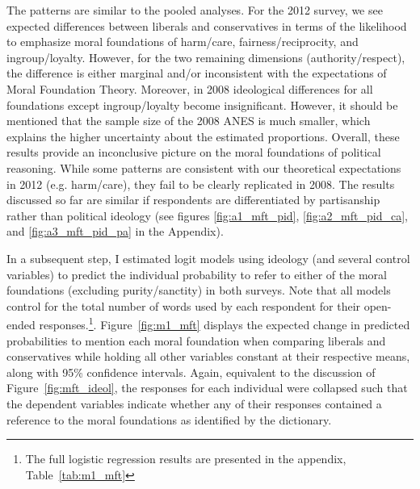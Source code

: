 \documentclass[12pt]{article}
\begin{document}
The patterns are similar to the pooled analyses. For the 2012 survey, we see expected differences between liberals and conservatives in terms of the likelihood to emphasize moral foundations of harm/care, fairness/reciprocity, and ingroup/loyalty. However, for the two remaining dimensions (authority/respect), the difference is either marginal and/or inconsistent with the expectations of Moral Foundation Theory. Moreover, in 2008 ideological differences for all foundations except ingroup/loyalty become insignificant. However, it should be mentioned that the sample size of the 2008 ANES is much smaller, which explains the higher uncertainty about the estimated proportions. Overall, these results provide an inconclusive picture on the moral foundations of political reasoning. While some patterns are consistent with our theoretical expectations in 2012 (e.g. harm/care), they fail to be clearly replicated in 2008. The results discussed so far are similar if respondents are differentiated by partisanship rather than political ideology (see figures \ref{fig:a1_mft_pid}, \ref{fig:a2_mft_pid_ca}, and \ref{fig:a3_mft_pid_pa} in the Appendix).

In a subsequent step, I estimated logit models using ideology (and several control variables) to predict the individual probability to refer to either of the moral foundations (excluding purity/sanctity) in both surveys. Note that all models control for the total number of words used by each respondent for their open-ended responses.\footnote{The full logistic regression results are presented in the appendix, Table~\ref{tab:m1_mft}}. Figure~\ref{fig:m1_mft} displays the expected change in predicted probabilities to mention each moral foundation when comparing liberals and conservatives while holding all other variables constant at their respective means, along with 95\% confidence intervals. Again, equivalent to the discussion of Figure~\ref{fig:mft_ideol}, the responses for each individual were collapsed such that the dependent variables indicate whether any of their responses contained a reference to the moral foundations as identified by the dictionary. 
\end{document}
